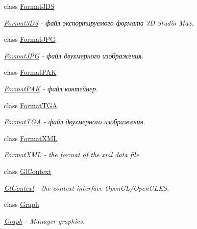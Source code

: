 \begin{DoxyCompactItemize}
class \hyperlink{classcsad_1_1_format3_d_s}{Format3\-D\-S}
\begin{DoxyCompactList}\small\item\em \hyperlink{classcsad_1_1_format3_d_s}{Format3\-D\-S} -\/ файл экспортируемого формата 3\-D Studio Max. \end{DoxyCompactList}\item 
class \hyperlink{classcsad_1_1_format_j_p_g}{Format\-J\-P\-G}
\begin{DoxyCompactList}\small\item\em \hyperlink{classcsad_1_1_format_j_p_g}{Format\-J\-P\-G} -\/ файл двухмерного изображения. \end{DoxyCompactList}\item 
class \hyperlink{classcsad_1_1_format_p_a_k}{Format\-P\-A\-K}
\begin{DoxyCompactList}\small\item\em \hyperlink{classcsad_1_1_format_p_a_k}{Format\-P\-A\-K} -\/ файл контейнер. \end{DoxyCompactList}\item 
class \hyperlink{classcsad_1_1_format_t_g_a}{Format\-T\-G\-A}
\begin{DoxyCompactList}\small\item\em \hyperlink{classcsad_1_1_format_t_g_a}{Format\-T\-G\-A} -\/ файл двухмерного изображения. \end{DoxyCompactList}\item 
class \hyperlink{classcsad_1_1_format_x_m_l}{Format\-X\-M\-L}
\begin{DoxyCompactList}\small\item\em \hyperlink{classcsad_1_1_format_x_m_l}{Format\-X\-M\-L} -\/ the format of the xml data file. \end{DoxyCompactList}\item 
class \hyperlink{classcsad_1_1_gl_context}{Gl\-Context}
\begin{DoxyCompactList}\small\item\em \hyperlink{classcsad_1_1_gl_context}{Gl\-Context} -\/ the context interface Open\-G\-L/\-Open\-G\-L\-E\-S. \end{DoxyCompactList}\item 
class \hyperlink{classcsad_1_1_graph}{Graph}
\begin{DoxyCompactList}\small\item\em \hyperlink{classcsad_1_1_graph}{Graph} -\/ Manager graphics. \end{DoxyCompactList}\item 

\end{DoxyCompactItemize}
